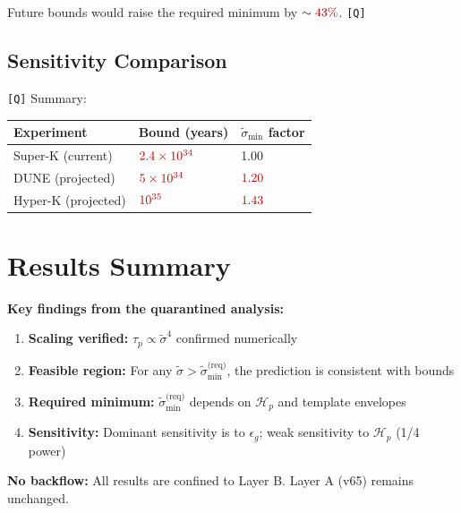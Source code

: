 \documentclass[11pt,a4paper]{article}
\newcommand{\Qval}[1]{\textcolor{red!70!black}{#1}}
\newcommand{\tagQ}{\textcolor{red!70!black}{\texttt{[Q]}}}
\theoremstyle{definition}
\begin{document}
Future bounds would raise the required minimum by $\sim \Qval{43\%}$. \tagQ{}

\subsection{Sensitivity Comparison}
\label{app:sens-comp}

\tagQ{} Summary:

\begin{center}
\begin{tabular}{lll}
\toprule
Experiment & Bound (years) & $\tilde{\sigma}_{\min}$ factor \\
\midrule
\Qval{Super-K (current)} & $\Qval{2.4 \times 10^{34}}$ & 1.00 \\
\Qval{DUNE (projected)} & $\Qval{5 \times 10^{34}}$ & $\Qval{1.20}$ \\
\Qval{Hyper-K (projected)} & $\Qval{10^{35}}$ & $\Qval{1.43}$ \\
\bottomrule
\end{tabular}
\end{center}



\section{Results Summary}
\label{sec:results}

\begin{resultbox}
\textbf{Key findings from the quarantined analysis:}

\begin{enumerate}
  \item \textbf{Scaling verified:} $\tau_p \propto \tilde{\sigma}^4$ confirmed numerically
  \item \textbf{Feasible region:} For any $\tilde{\sigma} > \tilde{\sigma}_{\min}^{\text{(req)}}$,
        the prediction is consistent with bounds
  \item \textbf{Required minimum:} $\tilde{\sigma}_{\min}^{\text{(req)}}$ depends on $\mathcal{H}_p$
        and template envelopes
  \item \textbf{Sensitivity:} Dominant sensitivity is to $\epsilon_g$;
        weak sensitivity to $\mathcal{H}_p$ (1/4 power)
\end{enumerate}

\textbf{No backflow:} All results are confined to Layer B.
Layer A (v65) remains unchanged.
\end{resultbox}
\end{document}
